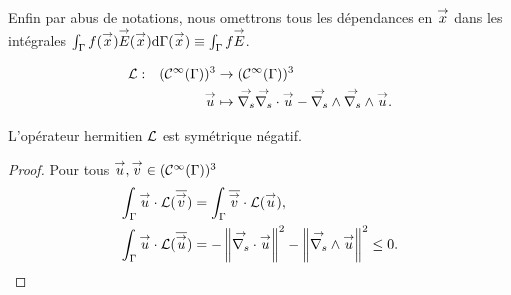   Enfin par abus de notations, nous omettrons tous les dépendances en \(\vx\) dans les intégrales \(\int_\Gamma f(\vx)\vE(\vx)\dd{\Gamma(\vx)}\equiv \int_\Gamma f\vE\).
  \begin{defn}
    \label{def:operator:L}
    \begin{equation*}
        \fonction{\LL}{(\mathcal{C}^\infty(\Gamma))^3}{(\mathcal{C}^\infty(\Gamma))^3}
          {\vu}{\vgrads{\vdivs \vu} - \vrots{\vrots \vu}.}
    \end{equation*}
  \end{defn}

  \begin{prop}
    \label{eq:hodge:negatif}
    L’opérateur hermitien \(\LL\) est symétrique négatif.
  \end{prop}

  \begin{proof}
    Pour tous \(\vu,\vv \in (\mathcal C^\infty(\Gamma))^3\)
    \begin{align*}
      \int_\Gamma \vu\cdot \LL(\conj{\vv}) &= \int_\Gamma \conj{\vv}\cdot \LL(\vu),
      \\
      \int_\Gamma \vu\cdot \LL(\conj{\vu}) &= -\norm{\vdivs{\vu}}^2 - \norm{\vrots\vu}^2 \le 0.
    \end{align*}
  \end{proof}


